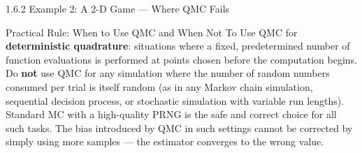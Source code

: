 \documentclass[aspectratio=169,10pt]{beamer}
\begin{document}
\begin{frame}[allowframebreaks]{1.6.2 Example 2: A 2-D Game --- Where QMC Fails}
  \begin{alertblock}{Practical Rule: When to Use QMC and When Not To}
    Use QMC for \textbf{deterministic quadrature}: situations where a fixed,
    predetermined number of function evaluations is performed at points chosen
    before the computation begins.  Do \textbf{not} use QMC for any simulation
    where the number of random numbers consumed per trial is itself random (as
    in any Markov chain simulation, sequential decision process, or stochastic
    simulation with variable run lengths).  Standard MC with a high-quality PRNG
    is the safe and correct choice for all such tasks.  The bias introduced by
    QMC in such settings cannot be corrected by simply using more samples ---
    the estimator converges to the wrong value.
  \end{alertblock}

\end{frame}
\end{document}
